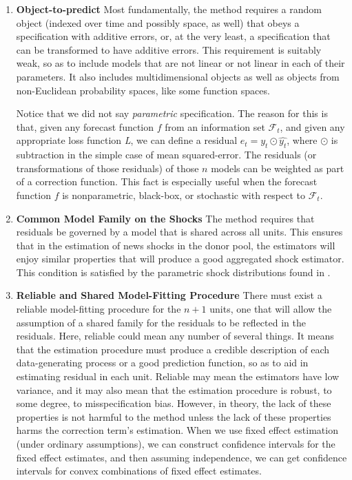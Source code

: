 \documentclass[11pt]{article}
\theoremstyle{definition}
\begin{document}
\begin{enumerate}
  \item \textbf{Object-to-predict}
  Most fundamentally, the method requires a random object (indexed over time and possibly space, as well) that obeys a specification with additive errors, or, at the very least, a specification that can be transformed to have additive errors.  This requirement is suitably weak, so as to include models that are not linear or not linear in each of their parameters.  It also includes multidimensional objects as well as objects from non-Euclidean probability spaces, like some function spaces.  

Notice that we did not say \textit{parametric} specification.  The reason for this is that, given any forecast function $f$ from an information set $\mathcal{F}_{t}$, and given any appropriate loss function \textit{L}, we can define a residual $e_{t} = y_{t} \odot \hat{y_{t}}$, where $\odot$ is subtraction in the simple case of mean squared-error.  The residuals (or transformations of those residuals) of those $n$ models can be weighted as part of a correction function.  This fact is especially useful when the forecast function $f$ is nonparametric, black-box, or stochastic with respect to $\mathcal{F}_{t}$.

\item \textbf{Common Model Family on the Shocks} The method requires that residuals be governed by a model that is shared across all units.  This ensures that in the estimation of news shocks in the donor pool, the estimators will enjoy similar properties that will produce a good aggregated shock estimator.  This condition is satisfied by the parametric shock distributions found in \cite{lin2021minimizing,lundquist2024volatility}.

\item \textbf{Reliable and Shared Model-Fitting Procedure} There must exist a reliable model-fitting procedure for the $n+1$ units, one that will allow the assumption of a shared family for the residuals to be reflected in the residuals.  Here, reliable could mean any number of several things.  It means that the estimation procedure must produce a credible description of each data-generating process or a good prediction function, so as to aid in estimating residual in each unit.  Reliable may mean the estimators have low variance, and it may also mean that the estimation procedure is robust, to some degree, to misspecification bias.  However, in theory, the lack of these properties is not harmful to the method unless the lack of these properties harms the correction term's estimation.  When we use fixed effect estimation (under ordinary assumptions), we can construct confidence intervals for the fixed effect estimates, and then assuming independence, we can get confidence intervals for convex combinations of fixed effect estimates.


\end{enumerate}
\end{document}
